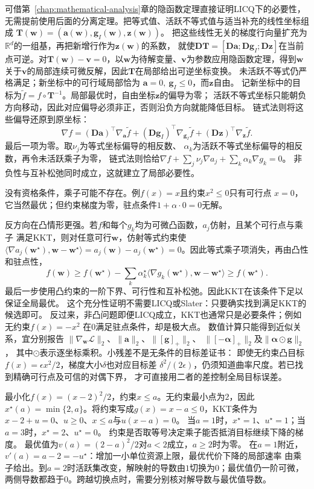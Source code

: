 可借第~\ref{chap:mathematical-analysis}章的隐函数定理直接证明LICQ下的必要性，
无需提前使用后面的分离定理。把等式值、活跃不等式值与适当补充的线性坐标组成
$\bm T(\bm w)=(\bm a(\bm w),\bm g_I(\bm w),\bm z(\bm w))$。
把这些线性无关的梯度行向量扩充为$\mathbb R^d$的一组基，再把新增行作为$\bm z(\bm w)$的系数，
就使$\bm D\bm T=[\bm D\bm a;\bm D\bm g_I;\bm D\bm z]$在当前点可逆。对$\bm T(\bm w)-\bm v=0$，以$\bm w$为待解变量、$\bm v$为参数应用隐函数定理，得到$\bm w$关于$\bm v$的局部连续可微反解，因此$\bm T$在局部给出可逆坐标变换。
未活跃不等式仍严格满足；新坐标中的可行域局部恰为
$\bm a=0,\ \bm g_I\leq0$，而$\bm z$自由。
记新坐标中的目标为$\widetilde f=f\circ\bm T^{-1}$。局部最优时，自由坐标$\bm z$的偏导为零；
活跃不等式坐标只能朝负方向移动，因此对应偏导必须非正，否则沿负方向就能降低目标。
链式法则将这些偏导还原到原坐标：
\[
 \nabla f=(\bm D\bm a)^\top\nabla_{\bm a}\widetilde f
          +(\bm D\bm g_I)^\top\nabla_{\bm g_I}\widetilde f
          +(\bm D\bm z)^\top\nabla_{\bm z}\widetilde f.
\]
最后一项为零。取$\nu_j$为等式坐标偏导的相反数、
$\alpha_k$为活跃不等式坐标偏导的相反数，再令未活跃乘子为零，
链式法则恰给$\nabla f+\sum_j\nu_j\nabla a_j+\sum_k\alpha_k\nabla g_k=0$。
非负性与互补松弛同时成立，这就建立了局部必要性。

没有资格条件，乘子可能不存在。例$f(x)=x$且约束$x^2\leq0$只有可行点
$x=0$，它当然最优；但约束梯度为零，驻点条件$1+\alpha\cdot0=0$无解。

反方向在凸情形更强。若$f$和每个$g_k$均为可微凸函数，$a_j$仿射，且某个可行点与乘子
满足KKT，则对任意可行$\bm{w}$，仿射等式约束使
$\langle\nabla a_j(\bm{w}^{\star}),\bm{w}-\bm{w}^{\star}\rangle
=a_j(\bm{w})-a_j(\bm{w}^{\star})=0$。因此等式乘子项消失，再由凸性和驻点性，
\[
  f(\bm{w})\geq
  f(\bm{w}^{\star})
  -\sum_k\alpha_k^{\star}
  \langle\nabla g_k(\bm{w}^{\star}),\bm{w}-\bm{w}^{\star}\rangle
  \geq f(\bm{w}^{\star}).
\]
最后一步使用凸约束的一阶下界、可行性和互补松弛。因此KKT在该条件下足以保证全局最优。
这个充分性证明不需要LICQ或Slater：只要确实找到满足KKT的候选即可。
反过来，非凸问题即便LICQ成立，KKT也通常只是必要条件；例如无约束$f(x)=-x^2$
在$0$满足驻点条件，却是极大点。
数值计算只能得到近似关系，宜分别报告
$\|\nabla_{\bm w}\mathcal L\|_2$、$\|\bm a\|_2$、$\|[\bm g]_+\|_2$、
$\|[-\bm\alpha]_+\|_2$及$\|\bm\alpha\odot\bm g\|_2$，
其中$\odot$表示逐坐标乘积。小残差不是无条件的目标差证书：
即使无约束凸目标$f(x)=\epsilon x^2/2$，梯度大小$\delta$也对应目标差
$\delta^2/(2\epsilon)$，仍须知道曲率尺度。若已找到精确可行点及可信的对偶下界，
才可直接用二者的差控制全局目标误差。

\begin{example}[活跃约束与乘子]
\label{ex:opt-scalar-active-constraint}
最小化$f(x)=(x-2)^2/2$，约束$x\leq a$。无约束最小点为$2$，因此
$x^\star(a)=\min\{2,a\}$。将约束写成$g(x)=x-a\leq0$，KKT条件为
$x-2+u=0$、$u\geq0$、$x\leq a$与$u(x-a)=0$。
当$a=1$时，$x^\star=1$、$u^\star=1$；当$a=3$时，$x^\star=2$、$u^\star=0$。
约束是否取等号决定乘子能否抵消目标继续下降的梯度。
最优值为$v(a)=(2-a)^2/2$对$a<2$成立，$a\geq2$时为零。
在$a=1$附近，$v'(a)=a-2=-u^\star$：增加一小单位资源上限，最优代价下降的局部速率
由乘子给出。到$a=2$时活跃集改变，解映射的导数由$1$切换为$0$；最优值仍一阶可微，两侧导数都趋于$0$。跨越切换点时，需要分别核对解导数与最优值导数。
\end{example}

